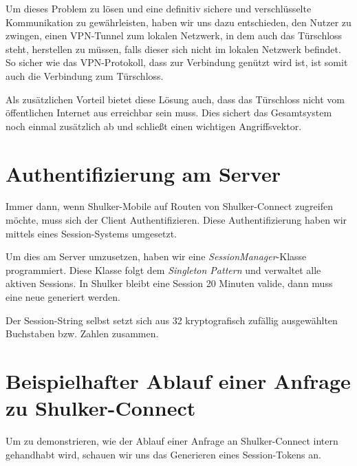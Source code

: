 Um dieses Problem zu lösen und eine definitiv sichere und verschlüsselte Kommunikation zu gewährleisten, haben wir uns dazu 
entschieden, den Nutzer zu zwingen, einen VPN-Tunnel zum lokalen Netzwerk, in dem auch das Türschloss steht, herstellen
zu müssen, falls dieser sich nicht im lokalen Netzwerk befindet. So sicher wie das VPN-Protokoll, dass zur Verbindung genützt
wird ist, ist somit auch die Verbindung zum Türschloss.

Als zusätzlichen Vorteil bietet diese Lösung auch, dass das Türschloss nicht vom öffentlichen Internet aus erreichbar sein muss.
Dies sichert das Gesamtsystem noch einmal zusätzlich ab und schließt einen wichtigen Angriffsvektor.

\section{Authentifizierung am Server}
Immer dann, wenn Shulker-Mobile auf Routen von Shulker-Connect zugreifen möchte, muss sich der Client Authentifizieren.
Diese Authentifizierung haben wir mittels eines Session-Systems umgesetzt.

Um dies am Server umzusetzen, haben wir eine \textit{SessionManager}-Klasse programmiert. Diese Klasse folgt dem
\textit{Singleton Pattern} und verwaltet alle aktiven Sessions. In Shulker bleibt eine Session 20 Minuten valide, dann
muss eine neue generiert werden.

Der Session-String selbst setzt sich aus 32 kryptografisch zufällig ausgewählten Buchstaben bzw. Zahlen zusammen.

\section{Beispielhafter Ablauf einer Anfrage zu Shulker-Connect}
Um zu demonstrieren, wie der Ablauf einer Anfrage an Shulker-Connect intern gehandhabt wird, schauen wir uns das Generieren
eines Session-Tokens an.

